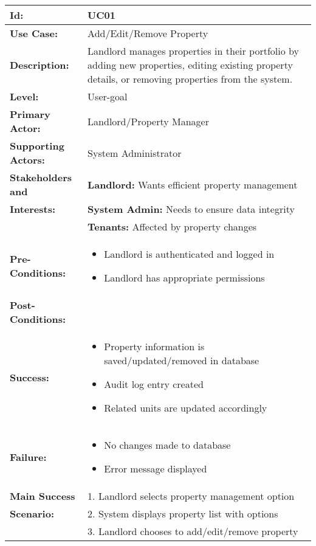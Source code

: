 \documentclass[12pt]{article}
\begin{document}
\begin{longtable}{|p{3cm}|p{11cm}|}
\hline
\textbf{Id:} & UC01 \\
\hline
\textbf{Use Case:} & Add/Edit/Remove Property \\
\hline
\textbf{Description:} & Landlord manages properties in their portfolio by adding new properties, editing existing property details, or removing properties from the system. \\
\hline
\textbf{Level:} & User-goal \\
\hline
\textbf{Primary Actor:} & Landlord/Property Manager \\
\hline
\textbf{Supporting Actors:} & System Administrator \\
\hline
\textbf{Stakeholders and} & \textbf{Landlord:} Wants efficient property management \\
\textbf{Interests:} & \textbf{System Admin:} Needs to ensure data integrity \\
& \textbf{Tenants:} Affected by property changes \\
\hline
\textbf{Pre-Conditions:} & 
\begin{itemize}
    \item Landlord is authenticated and logged in
    \item Landlord has appropriate permissions
\end{itemize} \\
\hline
\textbf{Post-Conditions:} & \\
\textbf{Success:} & 
\begin{itemize}
    \item Property information is saved/updated/removed in database
    \item Audit log entry created
    \item Related units are updated accordingly
\end{itemize} \\
\textbf{Failure:} & 
\begin{itemize}
    \item No changes made to database
    \item Error message displayed
\end{itemize} \\
\hline
\textbf{Main Success} & 1. Landlord selects property management option \\
\textbf{Scenario:} & 2. System displays property list with options \\
& 3. Landlord chooses to add/edit/remove property \\

\end{longtable}
\end{document}
